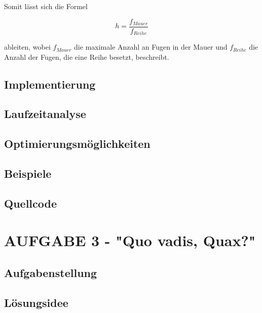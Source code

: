 \documentclass[a4paper,12pt]{article}
\begin{document}
Somit lässt sich die Formel
\begin{center}
\begin{Large}
\[h = \frac{f_{Mauer}}{f_{Reihe}}\]
\end{Large}
\end{center}
ableiten, wobei $f_{Mauer}$ die maximale Anzahl an Fugen in der Mauer und $f_{Reihe}$ die Anzahl der Fugen, die eine Reihe besetzt, beschreibt.




\subsection{Implementierung}

\subsection{Laufzeitanalyse}

\subsection{Optimierungsmöglichkeiten}

\subsection{Beispiele}

\subsection{Quellcode}


\newpage
\section{AUFGABE 3 - "Quo vadis, Quax?"}



\subsection{Aufgabenstellung}

\subsection{Lösungsidee}
\end{document}
